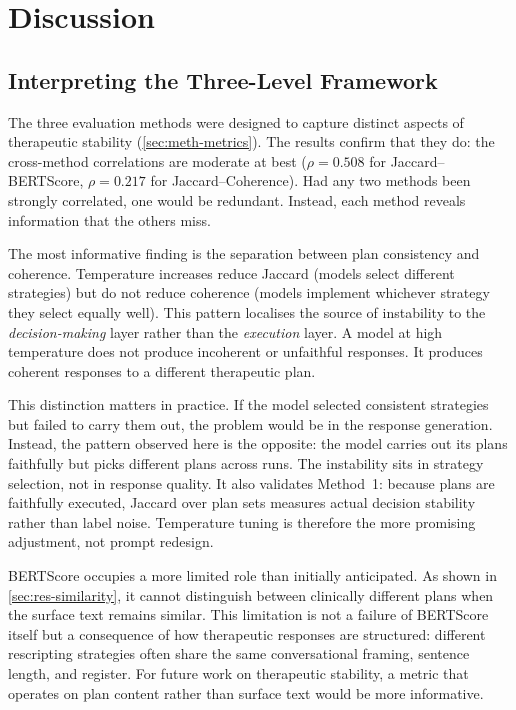 \chapter{Discussion}
\label{chap:discussion}

\section{Interpreting the Three-Level Framework}
\label{sec:disc-framework-interpretation}

The three evaluation methods were designed to capture distinct aspects of
therapeutic stability (\autoref{sec:meth-metrics}). The results confirm
that they do: the cross-method correlations are moderate at best
($\rho = 0.508$ for Jaccard--BERTScore, $\rho = 0.217$ for
Jaccard--Coherence). Had any two methods been strongly correlated, one
would be redundant. Instead, each method reveals information that the
others miss.

The most informative finding is the separation between plan consistency
and coherence. Temperature increases reduce Jaccard (models select
different strategies) but do not reduce coherence (models implement
whichever strategy they select equally well). This pattern localises the
source of instability to the \emph{decision-making} layer rather than the
\emph{execution} layer. A model at high temperature does not produce
incoherent or unfaithful responses. It produces coherent responses to a
different therapeutic plan.

This distinction matters in practice. If the model selected consistent
strategies but failed to carry them out, the problem would be in the
response generation. Instead, the pattern observed here is the opposite:
the model carries out its plans faithfully but picks different plans across
runs. The instability sits in strategy selection, not in response quality.
It also validates Method~1: because plans are faithfully executed,
Jaccard over plan sets measures actual decision stability rather than
label noise. Temperature tuning is therefore the more promising
adjustment, not prompt redesign.

BERTScore occupies a more limited role than initially anticipated.
As shown in \autoref{sec:res-similarity}, it cannot distinguish between
clinically different plans when the surface text remains similar. This
limitation is not a failure of BERTScore itself but a consequence of how
therapeutic responses are structured: different rescripting strategies
often share the same conversational framing, sentence length, and
register. For future work on therapeutic stability, a metric that
operates on plan content rather than surface text would be more
informative.


